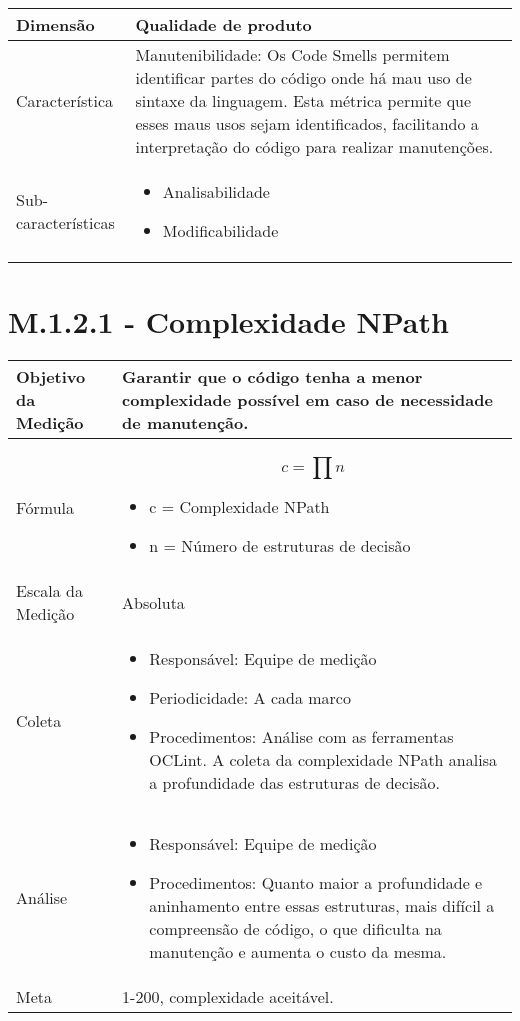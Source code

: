 	\begin{tabular}{ |p{4cm}|p{8cm}| }
	\hline
	  Dimensão 		& 	Qualidade de produto	 \\
	 \hline
	 Característica 		& 	Manutenibilidade: Os Code Smells permitem identificar partes do código onde há mau uso de sintaxe da linguagem. Esta métrica permite que esses maus usos sejam identificados, facilitando a interpretação do código para realizar manutenções. \\
	 \hline
	 Sub-características 		& 	\begin{itemize}	\item Analisabilidade \item Modificabilidade \end{itemize} \\
	 \hline
	\end{tabular}

\section{M.1.2.1 - Complexidade NPath}

	\begin{tabular}{ |p{4cm}|p{8cm}|  }
	 \hline
	 Objetivo da Medição 		& 	  Garantir que o código tenha a menor complexidade possível em caso de necessidade de manutenção. \\
	 \hline
	 Fórmula		& 		\[ c = \prod{n} \] \begin{itemize} \item c = Complexidade NPath 
	 \item n = Número de estruturas de decisão \end{itemize}\\
	 \hline
	 Escala da Medição 		& 		Absoluta \\
	 \hline
	  
	 Coleta		& 		\begin{itemize} \item Responsável: Equipe de medição \item Periodicidade: A cada marco \item Procedimentos: Análise com as ferramentas OCLint. A coleta da complexidade NPath analisa a profundidade das estruturas de decisão. \end{itemize} \\
	 \hline
	 Análise		& 		\begin{itemize} \item Responsável: Equipe de medição \item Procedimentos: Quanto maior a profundidade e aninhamento entre essas estruturas, mais difícil a compreensão de código, o que dificulta na manutenção e aumenta o custo da mesma. \end{itemize} \\
	 \hline
	 Meta		& 	1-200, complexidade aceitável. \\
	 \hline
	\end{tabular}


